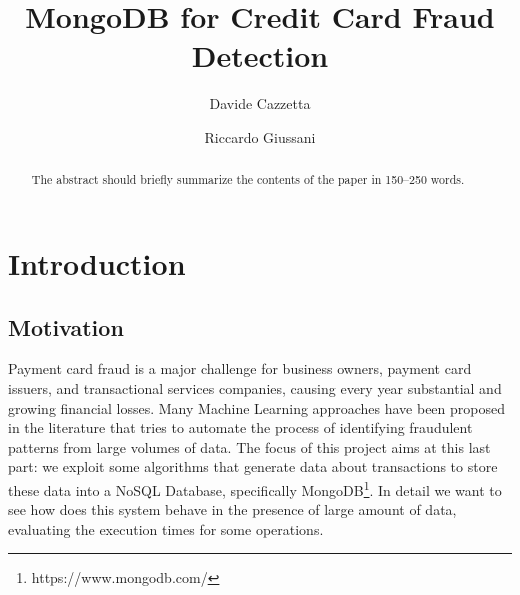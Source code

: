 \documentclass[runningheads]{llncs}
\begin{document}
\title{MongoDB for Credit Card Fraud Detection}

\author{Davide Cazzetta \and Riccardo Giussani}

%
%
\maketitle              %
%
\begin{abstract}
The abstract should briefly summarize the contents of the paper in
150--250 words.

\end{abstract}

\section{Introduction}

\subsection{Motivation}

Payment card fraud is a major challenge for business owners, payment card issuers, and transactional services companies, causing every year substantial and growing financial losses. Many Machine Learning approaches have been proposed in the literature that tries to automate the process of identifying fraudulent patterns from large volumes of data. The focus of this project aims at this last part: we exploit some algorithms that generate data about transactions to store these data into a NoSQL Database, specifically MongoDB\footnote{https://www.mongodb.com/}. In detail we want to see how does this system behave in the presence of large amount of data, evaluating the execution times for some operations.
\end{document}
